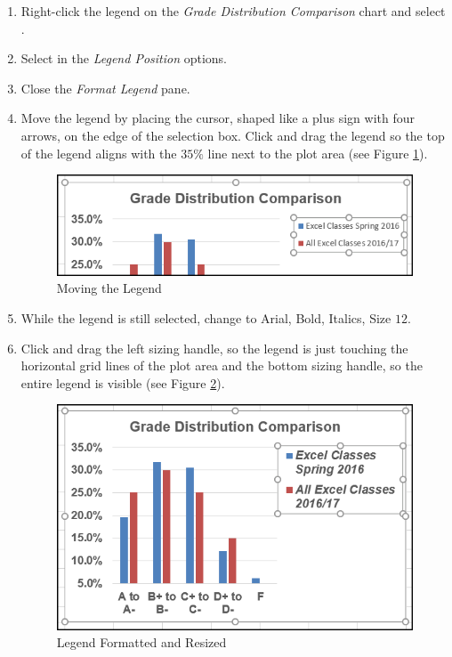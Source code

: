 \begin{enumbox}
	\begin{enumerate}
		\item Right-click the legend on the \textit{Grade Distribution Comparison} chart and select .
		\item Select  in the \textit{Legend Position} options. 
		\item Close the \textit{Format Legend} pane.
		\item Move the legend by placing the cursor, shaped like a plus sign with four arrows, on the edge of the selection box. Click and drag the legend so the top of the legend aligns with the $ 35\% $ line next to the plot area (see Figure \ref{04:fig31}).
	
		\begin{figure}[H]
			\centering
			\includegraphics[width=\maxwidth{.95\linewidth}]{gfx/ch04_fig31}
			\caption{Moving the Legend}
			\label{04:fig31}
		\end{figure}
	
		\item While the legend is still selected, change  to Arial, Bold, Italics, Size $ 12 $.
		\item Click and drag the left sizing handle, so the legend is just touching the horizontal grid lines of the plot area and the bottom sizing handle, so the entire legend is visible (see Figure \ref{04:fig32}).
	
		\begin{figure}[H]
			\centering
			\includegraphics[width=\maxwidth{.95\linewidth}]{gfx/ch04_fig32}
			\caption{Legend Formatted and Resized}
			\label{04:fig32}
		\end{figure}
	

\end{enumerate}
\end{enumbox}
